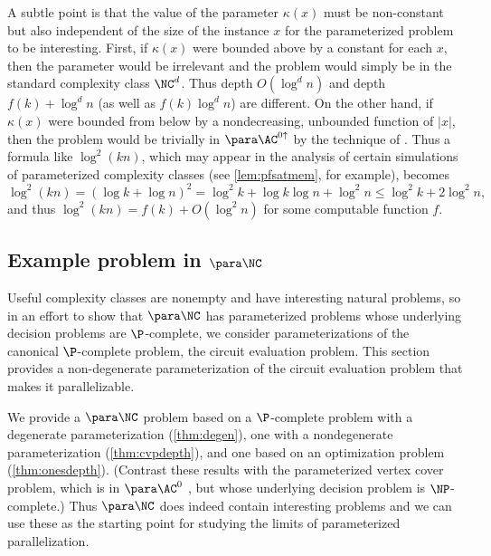 A subtle point is that the value of the parameter $\kappa(x)$ must be non-constant but also independent of the size of the instance $x$ for the parameterized problem to be interesting.
First, if $\kappa(x)$ were bounded above by a constant for each $x$, then the parameter would be irrelevant and the problem would simply be in the standard complexity class $\NC^d$.
Thus depth $O(\log^d n)$ and depth $f(k) + \log^d n$ (as well as $f(k) \log^d n$) are different.
On the other hand, if $\kappa(x)$ were bounded from below by a nondecreasing, unbounded function of $|x|$, then the problem would be trivially in $\para \AC^{0 \uparrow}$ by the technique of \autocite[Proposition~1.7]{fg06}.
Thus a formula like $\log^2 (kn)$, which may appear in the analysis of certain simulations of parameterized complexity classes (see \autoref{lem:pfsatmem}, for example), becomes
\[
\log^2 (kn) = (\log k + \log n)^2 = \log^2 k + \log k \log n + \log^2 n \leq \log^2 k + 2 \log^2 n,
\]
and thus $\log^2 (kn) = f(k) + O(\log^2 n)$ for some computable function $f$.

\subsection{Example problem in \texorpdfstring{$\para \NC$}{paraNC}}
\label{sec:parancexample}

%
%
%
Useful complexity classes are nonempty and have interesting natural problems,
%
%
%
so in an effort to show that $\para \NC$ has parameterized problems whose underlying decision problems are $\P$-complete,
%
%
%
we consider parameterizations of the canonical $\P$-complete problem, the circuit evaluation problem.
%
%
%
%
This section provides a non-degenerate parameterization of the circuit evaluation problem that makes it parallelizable.

%
%
%
We provide a $\para \NC$ problem based on a $\P$-complete problem with a degenerate parameterization (\autoref{thm:degen}), one with a nondegenerate parameterization (\autoref{thm:cvpdepth}), and one based on an optimization problem (\autoref{thm:onesdepth}).
(Contrast these results with the parameterized vertex cover problem, which is in $\para \AC^0$ \autocite{bst15}, but whose underlying decision problem is $\NP$-complete.)
%
%
%
Thus $\para \NC$ does indeed contain interesting problems
%
%
and we can use these as the starting point for studying the limits of parameterized parallelization.

